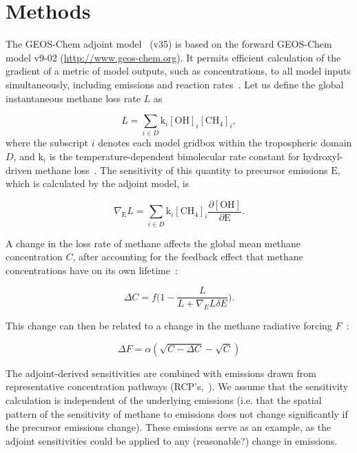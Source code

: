 \section{Methods}

The GEOS-Chem adjoint model~\cite{ref:henze2007} (v35) is based on the forward GEOS-Chem model v9-02 (\url{http://www.geos-chem.org}). It permits efficient calculation of the gradient of a metric of model outputs, such as concentrations, to all model inputs simultaneously, including emissions and reaction rates~\cite{ref:walker2015}. Let us define the global instantaneous methane loss rate $L$ as

\begin{equation}
L=\sum_{i \in D} \mathrm{k}_i \mathrm{[OH]}_i \mathrm{[CH_4]}_i,
\end{equation}
where the subscript $i$ denotes each model gridbox within the tropospheric domain $D$, and $\mathrm{k}_i$ is the temperature-dependent bimolecular rate constant for hydroxyl-driven methane loss~\citep{ref:sander2011}. The sensitivity of this quantity to precursor emissions $\mathrm{E}$, which is calculated by the adjoint model, is

\begin{equation}
\nabla_\mathrm{E} L = \sum_{i \in D} \mathrm{k}_i \mathrm{[CH_4]}_i \frac{\partial \mathrm{[OH]}}{\partial \mathrm{E}}.
\end{equation}

A change in the loss rate of methane affects the global mean methane concentration $C$, after accounting for the feedback effect that methane concentrations have on its own lifetime~\citep{ref:naik2005}:

\begin{equation}
\Delta C = f\big(1 - \frac{L}{L+\nabla_E L \delta E}\big).
\end{equation}

This change can then be related to a change in the methane radiative forcing $F$~\citep{ref:myhre1998}:

\begin{equation}
\Delta F = \alpha (\sqrt{C-\Delta C} - \sqrt{C})
\end{equation}

The adjoint-derived sensitivities are combined with emissions drawn from representative concentration pathways (RCP's,~\citet{ref:vanvuuren2011}). We assume that the sensitivity calculation is independent of the underlying emissions (i.e. that the spatial pattern of the sensitivity of methane to emissions does not change significantly if the precursor emissions change). These emissions serve as an example, as the adjoint sensitivities could be applied to any (reasonable?) change in emissions.